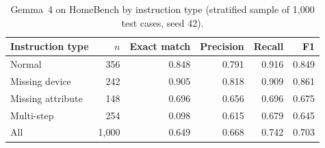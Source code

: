 \documentclass[a4paper,11pt]{article}
\begin{document}
\begin{table}[t]
  \centering
  \small
  \caption{End-to-end results of Gemma~4 31B in the multi-agent system with Lean-admitted
    command batches (QED\_LEAF audit passed). Gemma~4 via Ollama (Q4\_K\_M), thinking off,
    temperature 0, seed 42; DGX-2 (Tesla V100 32\,GB). DEXA has no native task score: precision,
    recall and F1 refer to the device types of the agents the system assigned a task, against the
    device types of all required and acceptable intents. Exact match is the share of cases whose
    output is fully correct (DEXA: identical device set; HomeBench: all commands correct).}
  \label{tab:gemma4-e2e}
\end{table}

\begin{table}[t]
  \centering
  \small
  \caption{Gemma~4 on HomeBench by instruction type (stratified sample of 1,000 test cases, seed 42).}
  \label{tab:gemma4-homebench}
  \begin{tabular}{lrrrrr}
    \toprule
    Instruction type   & $n$   & Exact match & Precision & Recall & F1    \\
    \midrule
    Normal             & 356   & 0.848 & 0.791 & 0.916 & 0.849 \\
    Missing device     & 242   & 0.905 & 0.818 & 0.909 & 0.861 \\
    Missing attribute  & 148   & 0.696 & 0.656 & 0.696 & 0.675 \\
    Multi-step         & 254   & 0.098 & 0.615 & 0.679 & 0.645 \\
    \midrule
    All                & 1,000 & 0.649 & 0.668 & 0.742 & 0.703 \\
    \bottomrule
  \end{tabular}
\end{table}
\end{document}
